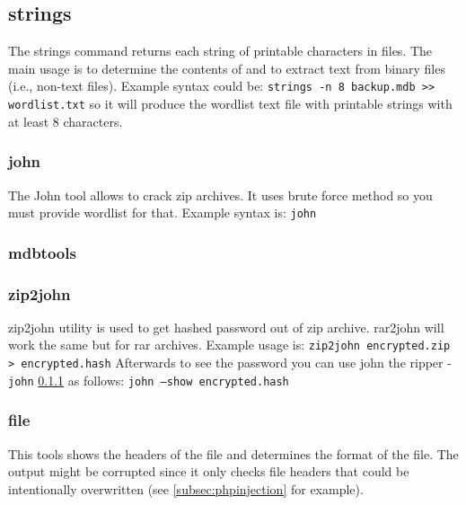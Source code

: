 \documentclass{article}[12pt]
\newcommand{\q}[1]{\texttt{#1}}
\begin{document}
\subsection{strings}

The strings command returns each string of printable characters in files.
The main usage is to determine the contents of and to extract text from binary files (i.e., non-text files).
Example syntax could be: \newline
\q{strings -n 8 backup.mdb >> wordlist.txt}\newline
so it will produce the wordlist text file with printable strings with at least 8 characters.
\subsubsection{john}
\label{subsubsec:john}
The John tool allows to crack zip archives.
It uses brute force method so you must provide wordlist for that.
Example syntax is: \newline
\q{john }
\subsubsection{mdbtools}
\subsubsection{zip2john}
zip2john utility is used to get hashed password out of zip archive.
rar2john will work the same but for rar archives.
Example usage is:\newline
\q{zip2john encrypted.zip > encrypted.hash} \newline
Afterwards to see the password you can use john the ripper - \q{john} \ref{subsubsec:john} as follows: \newline
\q{john  --show encrypted.hash}
\subsubsection{file}
\label{subsubsec:file}
This tools shows the headers of the file and determines the format of the file.
The output might be corrupted since it only checks file headers that could be intentionally overwritten (see \ref{subsec:phpinjection} for example).
\end{document}
